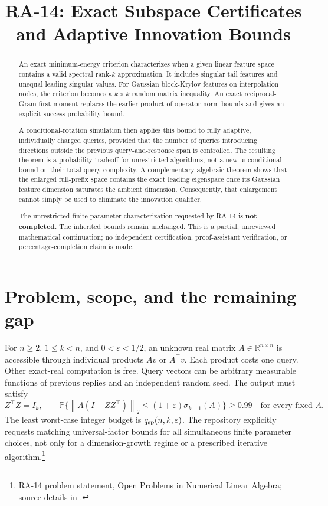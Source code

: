 \documentclass[11pt]{article}
\title{RA-14: Exact Subspace Certificates and Adaptive Innovation Bounds}
\author{}
\date{}
\theoremstyle{definition}
\newcommand{\R}{\mathbb R}
\newcommand{\Prob}{\mathbb P}
\newcommand{\norm}[1]{\left\lVert#1\right\rVert}
\begin{document}
\maketitle
\vspace{-2em}
\begin{abstract}
An exact minimum-energy criterion characterizes when a given linear feature space contains a valid spectral rank-$k$ approximation. It includes singular tail features and unequal leading singular values. For Gaussian block-Krylov features on interpolation nodes, the criterion becomes a $k\times k$ random matrix inequality. An exact reciprocal-Gram first moment replaces the earlier product of operator-norm bounds and gives an explicit success-probability bound.

A conditional-rotation simulation then applies this bound to fully adaptive, individually charged queries, provided that the number of queries introducing directions outside the previous query-and-response span is controlled. The resulting theorem is a probability tradeoff for unrestricted algorithms, not a new unconditional bound on their total query complexity. A complementary algebraic theorem shows that the enlarged full-prefix space contains the exact leading eigenspace once its Gaussian feature dimension saturates the ambient dimension. Consequently, that enlargement cannot simply be used to eliminate the innovation qualifier.

The unrestricted finite-parameter characterization requested by RA-14 is \textbf{not completed}. The inherited bounds remain unchanged. This is a partial, unreviewed mathematical continuation; no independent certification, proof-assistant verification, or percentage-completion claim is made.
\end{abstract}
\setcounter{tocdepth}{1}
\tableofcontents
\newpage

\section{Problem, scope, and the remaining gap}
For $n\ge2$, $1\le k<n$, and $0<\varepsilon<1/2$, an unknown real matrix $A\in\R^{n\times n}$ is accessible through individual products $Av$ or $A^\top v$. Each product costs one query. Other exact-real computation is free. Query vectors can be arbitrary measurable functions of previous replies and an independent random seed. The output must satisfy
\begin{equation}\label{eq:target}
 Z^\top Z=I_k,\qquad
 \Prob\{\norm{A(I-ZZ^\top)}_2\le(1+\varepsilon)\sigma_{k+1}(A)\}\ge0.99
 \quad\text{for every fixed }A.
\end{equation}
The least worst-case integer budget is $q_{\rm sp}(n,k,\varepsilon)$. The repository explicitly requests matching universal-factor bounds for all simultaneous finite parameter choices, not only for a dimension-growth regime or a prescribed iterative algorithm.\footnote{RA-14 problem statement, Open Problems in Numerical Linear Algebra; source details in \cite{repo}.}
\end{document}
